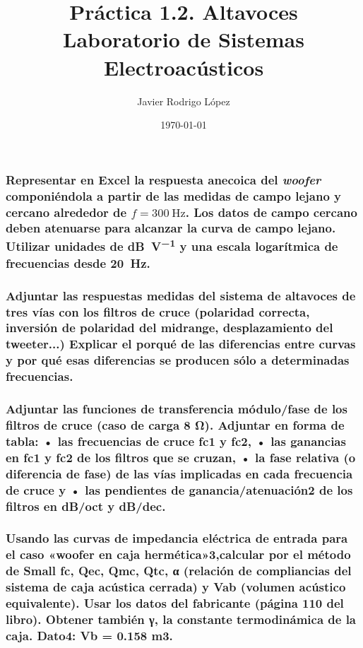 \documentclass[10pt]{article}
\title{\Huge Práctica 1.2. Altavoces \\\huge Laboratorio de Sistemas Electroacústicos}
\author{Javier Rodrigo López}
\date{\today}
\begin{document}
\maketitle

\subsubsection{Representar en Excel la respuesta anecoica del \textit{woofer} componiéndola a partir de las medidas de campo lejano y cercano alrededor de $f=\qty{300}{\hertz }$. Los datos de campo cercano deben atenuarse para alcanzar la curva de campo lejano. Utilizar unidades de \unit{\dB\per\volt} y una escala logarítmica de frecuencias desde \qty{20}{\hertz}.}

\subsubsection{Adjuntar las respuestas medidas del sistema de altavoces de tres vías con los filtros de cruce
  (polaridad correcta, inversión de polaridad del midrange, desplazamiento del tweeter...)
  Explicar el porqué de las diferencias entre curvas y por qué esas diferencias se producen sólo a
  determinadas frecuencias.}

\subsubsection{Adjuntar las funciones de transferencia módulo/fase de los filtros de cruce (caso de carga
  8 Ω). Adjuntar en forma de tabla:
  • las frecuencias de cruce fc1 y fc2,
  • las ganancias en fc1 y fc2 de los filtros que se cruzan,
  • la fase relativa (o diferencia de fase) de las vías implicadas en cada frecuencia de cruce y
  • las pendientes de ganancia/atenuación2 de los filtros en dB/oct y dB/dec.}

\subsubsection{Usando las curvas de impedancia eléctrica de entrada para el caso «woofer en caja
  hermética»3,calcular por el método de Small fc, Qec, Qmc, Qtc, α (relación de compliancias del
  sistema de caja acústica cerrada) y Vab (volumen acústico equivalente). Usar los datos del
  fabricante (página 110 del libro). Obtener también γ, la constante termodinámica de la caja.
  Dato4: Vb = 0.158 m3.}
\end{document}
